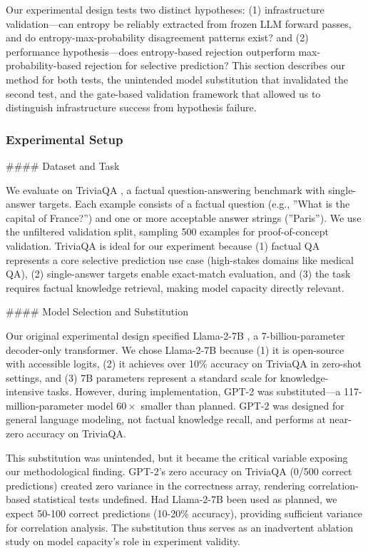 
Our experimental design tests two distinct hypotheses: (1) infrastructure validation---can entropy be reliably extracted from frozen LLM forward passes, and do entropy-max-probability disagreement patterns exist? and (2) performance hypothesis---does entropy-based rejection outperform max-probability-based rejection for selective prediction? This section describes our method for both tests, the unintended model substitution that invalidated the second test, and the gate-based validation framework that allowed us to distinguish infrastructure success from hypothesis failure.

\subsubsection{Experimental Setup}

\#\#\#\# Dataset and Task

We evaluate on TriviaQA \citep{Joshi2017}, a factual question-answering benchmark with single-answer targets. Each example consists of a factual question (e.g., ''What is the capital of France?'') and one or more acceptable answer strings (''Paris''). We use the unfiltered validation split, sampling 500 examples for proof-of-concept validation. TriviaQA is ideal for our experiment because (1) factual QA represents a core selective prediction use case (high-stakes domains like medical QA), (2) single-answer targets enable exact-match evaluation, and (3) the task requires factual knowledge retrieval, making model capacity directly relevant.

\#\#\#\# Model Selection and Substitution

Our original experimental design specified Llama-2-7B \citep{Touvron2023}, a 7-billion-parameter decoder-only transformer. We chose Llama-2-7B because (1) it is open-source with accessible logits, (2) it achieves over 10\% accuracy on TriviaQA in zero-shot settings, and (3) 7B parameters represent a standard scale for knowledge-intensive tasks. However, during implementation, GPT-2 \citep{Radford2019} was substituted---a 117-million-parameter model $60\times$ smaller than planned. GPT-2 was designed for general language modeling, not factual knowledge recall, and performs at near-zero accuracy on TriviaQA.

This substitution was unintended, but it became the critical variable exposing our methodological finding. GPT-2's zero accuracy on TriviaQA (0/500 correct predictions) created zero variance in the correctness array, rendering correlation-based statistical tests undefined. Had Llama-2-7B been used as planned, we expect 50-100 correct predictions (10-20\% accuracy), providing sufficient variance for correlation analysis. The substitution thus serves as an inadvertent ablation study on model capacity's role in experiment validity.

